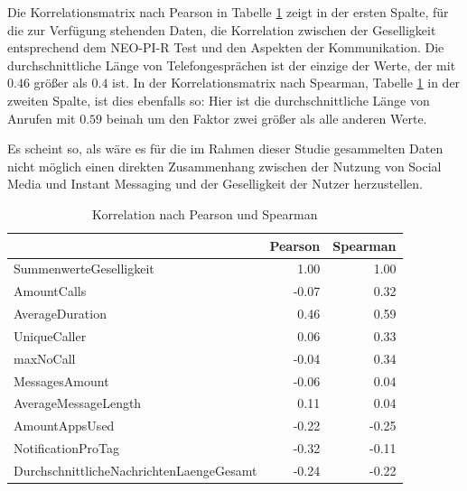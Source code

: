 Die Korrelationsmatrix nach Pearson in Tabelle \ref{cormatrix} zeigt in der ersten Spalte, für die zur Verfügung stehenden Daten, die Korrelation zwischen der Geselligkeit entsprechend dem NEO-PI-R Test und den Aspekten der Kommunikation.
Die durchschnittliche Länge von Telefongesprächen ist der einzige der Werte, der mit $0.46$ größer als $0.4$ ist.
In der Korrelationsmatrix nach Spearman, Tabelle \ref{cormatrix} in der zweiten Spalte,  ist dies ebenfalls so: Hier ist die durchschnittliche Länge von Anrufen mit $0.59$ beinah um den Faktor zwei größer als alle anderen Werte.

\par
Es scheint so, als wäre es für die im Rahmen dieser Studie gesammelten Daten nicht möglich einen direkten Zusammenhang zwischen der Nutzung von Social Media und Instant Messaging und der Geselligkeit der Nutzer herzustellen.

\begin{table}[]
\centering
\caption{Korrelation nach Pearson und Spearman}
\label{cormatrix}
\begin{tabular}{@{}lrr@{}}
\toprule
                                         & \multicolumn{1}{l}{Pearson} & \multicolumn{1}{l}{Spearman} \\ \midrule
SummenwerteGeselligkeit                  & 1.00                        & 1.00                         \\
AmountCalls                              & -0.07                       & 0.32                         \\
AverageDuration                          & 0.46                        & 0.59                         \\
UniqueCaller                             & 0.06                        & 0.33                         \\
maxNoCall                                & -0.04                       & 0.34                         \\
MessagesAmount                           & -0.06                       & 0.04                         \\
AverageMessageLength                     & 0.11                        & 0.04                         \\
AmountAppsUsed                           & -0.22                       & -0.25                        \\
NotificationProTag                       & -0.32                       & -0.11                        \\
DurchschnittlicheNachrichtenLaengeGesamt & -0.24                       & -0.22                        \\ \bottomrule
\end{tabular}
\end{table}


